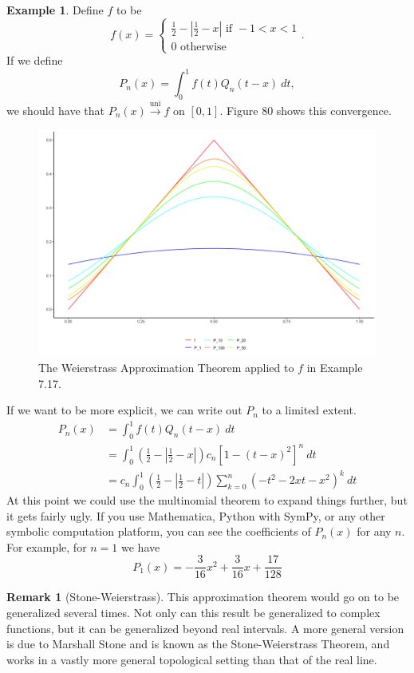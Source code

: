 \documentclass{article}
\newcommand{\uni}{\overset{\text{uni}}{\to}}
\theoremstyle{definition}
\newtheorem{example}{Example}[section]
\newtheorem{remark}{Remark}[section]
\begin{document}
	\begin{example}
		Define $ f $ to be $$f(x)=\begin{cases}
			\frac{1}{2}-\left\lvert \frac{1}{2}-x\right\rvert \text{ if } -1 <x<1\\
			0\text{ otherwise}
		\end{cases}. $$ If we define $$ P_n(x)=\int_{0}^{1}f(t)Q_n(t-x)\ dt, $$ we should have that $ P_n(x)\uni f $ on $ [0,1] $. Figure 80 shows this convergence. 
		\begin{figure}[h!]
			\centering
			\includegraphics[width=0.9\linewidth]{figures/SW_approx}
			\caption{The Weierstrass Approximation Theorem applied to $ f $ in Example 7.17.}
			\label{fig:swapprox}
		\end{figure}
		If we want to be more explicit, we can write out $ P_n $ to a limited extent.
		\begin{align*}
			P_n(x)&=\int_{0}^{1}f(t)Q_n(t-x)\ dt\\&=\int_{0}^{1}\left(\frac{1}{2}-\left\lvert \frac{1}{2}-x\right\rvert\right) c_n[1-(t-x)^2]^n\ dt\\
			&=c_n\int_{0}^{1}\left(\frac{1}{2}-\left\lvert \frac{1}{2}-t\right\rvert\right)\sum_{k=0}^{n}(-t^2-2xt-x^2)^k\ dt
		\end{align*}
		At this point we could use the multinomial theorem to expand things further, but it gets fairly ugly. If you use Mathematica, Python with SymPy, or any other symbolic computation platform,  you can see the coefficients of $ P_n(x) $ for any $ n $. For example, for $ n=1 $ we have $$ P_1(x)=-\frac{3}{16}x^2 + \frac{3}{16}x + \frac{17}{128}$$
	\end{example}
	\begin{remark}[Stone-Weierstrass]
		This approximation theorem would go on to be generalized several times. Not only can this result be generalized to complex functions, but it can be generalized beyond real intervals. A more general version is due to Marshall Stone and is known as the Stone-Weierstrass Theorem, and works in a vastly more general topological setting than that of the real line. 
		
	\end{remark}
	
\end{document}
